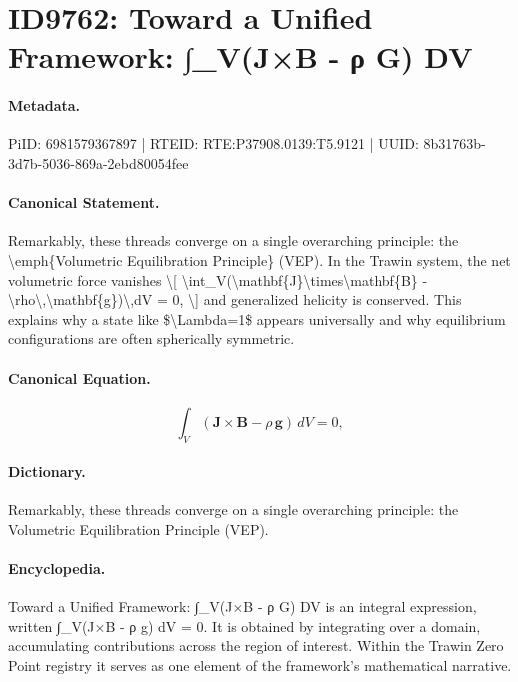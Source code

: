 \section*{ID9762: Toward a Unified Framework: ∫\_V(J×B - ρ G) DV}
\paragraph{Metadata.}
PiID: 6981579367897 | RTEID: RTE:P37908.0139:T5.9121 | UUID: 8b31763b-3d7b-5036-869a-2ebd80054fee

\paragraph{Canonical Statement.}
Remarkably, these threads converge on a single overarching principle: the \textbackslash{}emph\{Volumetric Equilibration Principle\} (VEP). In the Trawin system, the net volumetric force vanishes \textbackslash{}[ \textbackslash{}int\_V(\textbackslash{}mathbf\{J\}\textbackslash{}times\textbackslash{}mathbf\{B\} - \textbackslash{}rho\textbackslash{},\textbackslash{}mathbf\{g\})\textbackslash{},dV = 0, \textbackslash{}] and generalized helicity is conserved. This explains why a state like \$\textbackslash{}Lambda=1\$ appears universally and why equilibrium configurations are often spherically symmetric.

\paragraph{Canonical Equation.}
\[
\int_V(\mathbf{J}\times\mathbf{B} - \rho\,\mathbf{g})\,dV = 0,
\]

\paragraph{Dictionary.}
Remarkably, these threads converge on a single overarching principle: the Volumetric Equilibration Principle (VEP).

\paragraph{Encyclopedia.}
Toward a Unified Framework: ∫\_V(J×B - ρ G) DV is an integral expression, written ∫\_V(J×B - ρ g) dV = 0. It is obtained by integrating over a domain, accumulating contributions across the region of interest. Within the Trawin Zero Point registry it serves as one element of the framework's mathematical narrative.
